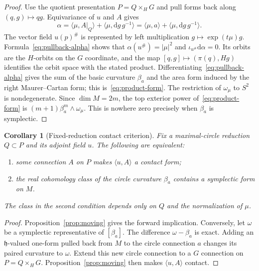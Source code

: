 \documentclass[11pt]{amsart}
\newcommand{\dd}{\mathrm d}
\theoremstyle{plain}
\newtheorem{corollary}[theorem]{Corollary}
\theoremstyle{definition}
\theoremstyle{remark}
\begin{document}
\begin{proof}
Use the quotient presentation $P=Q\times_HG$ and pull forms back
along $(q,g)\mapsto qg$.  Equivariance of $u$ and $A$ gives
\begin{equation}\label{eq:pullback-alpha}
 \alpha=\langle\mu,A|_Q\rangle
       +\langle\mu,\dd g\,g^{-1}\rangle
       =\langle\mu,a\rangle
       +\langle\mu,\dd g\,g^{-1}\rangle.
\end{equation}
The vector field $u(p)^\#$ is represented by left multiplication
$g\mapsto\exp(t\mu)g$.  Formula~\eqref{eq:pullback-alpha} shows
that $\alpha(u^\#)=|\mu|^2$ and $\iota_{u^\#}\dd\alpha=0$.
Its orbits are the $H$-orbits on the $G$ coordinate, and the map
$[q,g]\mapsto(\pi(q),Hg)$ identifies the orbit space with the stated
product.  Differentiating~\eqref{eq:pullback-alpha} gives the sum
of the basic curvature $\beta_a$ and the area form induced by the
right Maurer--Cartan form; this is~\eqref{eq:product-form}.
The restriction of $\omega_\mu$ to $S^2$ is nondegenerate.  Since
$\dim M=2m$, the top exterior power of~\eqref{eq:product-form}
is $(m+1)\beta_a^m\wedge\omega_\mu$.  This is nowhere zero
precisely when $\beta_a$ is symplectic.
\end{proof}

\begin{corollary}[Fixed-reduction contact criterion]
Fix a maximal-circle reduction $Q\subset P$ and its adjoint field
$u$.  The following are equivalent:
\begin{enumerate}
\item some connection $A$ on $P$ makes $\langle u,A\rangle$ a
contact form;
\item the real cohomology class of the circle curvature
$\beta_a$ contains a symplectic form on $M$.
\end{enumerate}
The class in the second condition depends only on $Q$ and the
normalization of $\mu$.
\end{corollary}

\begin{proof}
Proposition~\ref{prop:moving} gives the forward implication.
Conversely, let $\omega$ be a symplectic representative of
$[\beta_a]$.  The difference $\omega-\beta_a$ is exact.  Adding an
$\mathfrak h$-valued one-form pulled back from $M$ to the circle
connection $a$ changes its paired curvature to $\omega$.  Extend
this new circle connection to a $G$ connection on $P=Q\times_HG$.
Proposition~\ref{prop:moving} then makes $\langle u,A\rangle$
contact.
\end{proof}
\end{document}
